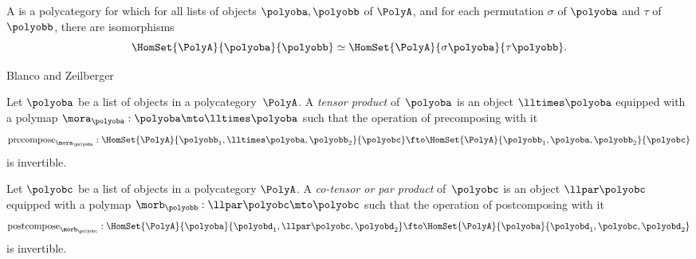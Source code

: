\begin{ctdefinition}
    \label{def:symmetric-polycategory}
    A  is a polycategory for which
    for all lists of objects $\polyoba, \polyobb$ of $\PolyA$, and for each permutation $\sigma$ of $\polyoba$ and $\tau$ of $\polyobb$,
    there are isomorphisms
    \begin{equation}
        \HomSet{\PolyA}{\polyoba}{\polyobb} \simeq \HomSet{\PolyA}{\sigma \polyoba}{\tau \polyobb}.
    \end{equation}
\end{ctdefinition}

Blanco and Zeilberger

\begin{ctdefinition}
    \label{def:tensor-polycategory}
    Let $\polyoba$ be a list of objects in a polycategory~$\PolyA$.
    A \emph{tensor product} of~$\polyoba$ is an object $\lltimes \polyoba$ equipped with a polymap
    $\mora_{\polyoba}: \polyoba \mto \lltimes \polyoba$ such that the operation of precomposing with it
    \begin{equation}
        \text{precompose}_{\mora_\polyoba}: \HomSet{\PolyA}{\polyobb_1, \lltimes\polyoba, \polyobb_2}{\polyobc}
        \fto \HomSet{\PolyA}{\polyobb_1, \polyoba, \polyobb_2}{\polyobc}
    \end{equation}
    is invertible.
\end{ctdefinition}


\begin{ctdefinition}
    \label{def:cotensor-polycategory}
    Let $\polyobc$ be a list of objects in a polycategory $\PolyA$.
    A \emph{co-tensor or par product} of~$\polyobc$ is an object $\llpar \polyobc$ equipped with a polymap
    $\morb_{\polyobb}: \llpar\polyobc \mto \polyobc$ such that the operation of postcomposing with it
    \begin{equation}
        \text{postcompose}_{\morb_\polyobc}: \HomSet{\PolyA}{\polyoba}{\polyobd_1, \llpar\polyobc, \polyobd_2}
        \fto \HomSet{\PolyA}{\polyoba}{\polyobd_1, \polyobc, \polyobd_2}
    \end{equation}
    is invertible.
\end{ctdefinition}

